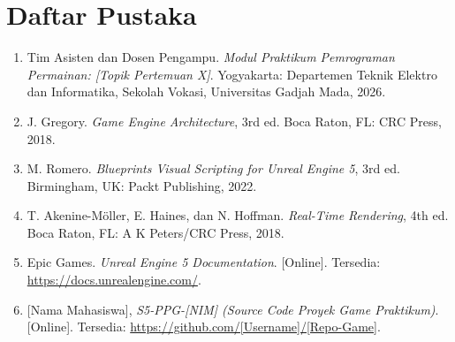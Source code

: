 \chapter{Daftar Pustaka}
\label{chap:daftarpustaka}

\begin{enumerate}
    \item \label{modulPPG} Tim Asisten dan Dosen Pengampu. \textit{Modul Praktikum Pemrograman Permainan: [Topik Pertemuan X]}. Yogyakarta: Departemen Teknik Elektro dan Informatika, Sekolah Vokasi, Universitas Gadjah Mada, 2026.
    
    \item \label{gregory} J. Gregory. \textit{Game Engine Architecture}, 3rd ed. Boca Raton, FL: CRC Press, 2018.
    
    \item \label{romero} M. Romero. \textit{Blueprints Visual Scripting for Unreal Engine 5}, 3rd ed. Birmingham, UK: Packt Publishing, 2022.
    
    \item \label{akenine} T. Akenine-Möller, E. Haines, dan N. Hoffman. \textit{Real-Time Rendering}, 4th ed. Boca Raton, FL: A K Peters/CRC Press, 2018.
    
    \item \label{engineDoc} Epic Games. \textit{Unreal Engine 5 Documentation}. [Online]. Tersedia: \url{https://docs.unrealengine.com/}.
    
    \item \label{sourcecode} [Nama Mahasiswa], \textit{S5-PPG-[NIM] (Source Code Proyek Game Praktikum)}. [Online]. Tersedia: \url{https://github.com/[Username]/[Repo-Game]}.
\end{enumerate}
